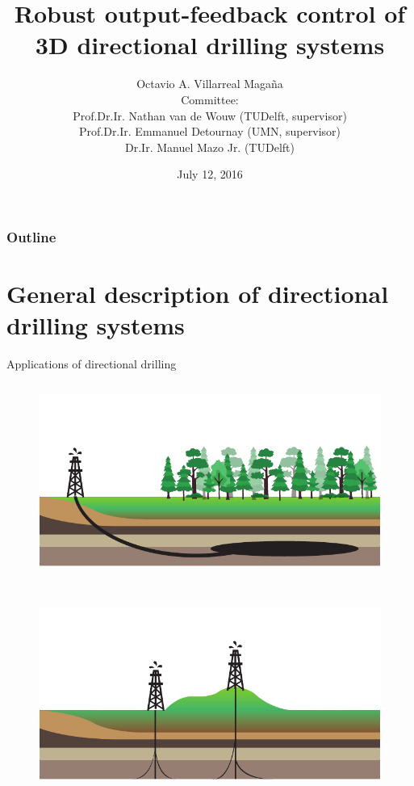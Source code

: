 \documentclass{beamer}
\title[Final MSc Presentation]{Robust output-feedback control of 3D directional drilling systems}
\institute[]{Delft University of Technology, The Netherlands \\ University of Minnesota, USA}
\author{Octavio A. Villarreal Maga\~na \vspace{10pt} \\ \scriptsize Committee:  \\ Prof.Dr.Ir. Nathan van de Wouw (TUDelft, supervisor) \\ \vspace{1.5pt} \hspace{-11pt}Prof.Dr.Ir. Emmanuel Detournay (UMN, supervisor) \\ \vspace{-2.5pt} \hspace{-74pt}Dr.Ir. Manuel Mazo Jr. (TUDelft)}
\date{July 12, 2016}
\newcommand*\titleTOC{Outline}
\begin{document}
{
\frame{\titlepage}
\begin{frame}\frametitle{\titleTOC}
	\tableofcontents
\end{frame}
}

{
}

\section{General description of directional drilling systems}

\begin{frame}{Applications of directional drilling}	
	\begin{columns}
	\hspace{0.9cm}\begin{column}{0.4\textwidth}
	\begin{figure}[t]
		\centering
		\begin{minipage}[t]{1\textwidth}
			\centering
			\includegraphics[width=1\linewidth]{images/appdd1.pdf}\\
		\end{minipage}%
		\\\begin{minipage}[t]{1\textwidth}
			\centering
			\includegraphics[width=1\linewidth]{images/appdd2.pdf}\\

\end{minipage}
\end{figure}
\end{column}
\end{columns}
\end{frame}
\end{document}
